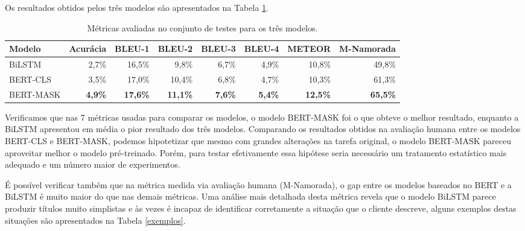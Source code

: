 \documentclass{article}
\begin{document}
Os resultados obtidos pelos três modelos são apresentados na Tabela \ref{table:results}.

\begin{table}[h!]
	\centering
	\begin{tabular}{@{}lrrrrrrr@{}}
		\toprule
		Modelo &
		\multicolumn{1}{l}{Acurácia} &
		\multicolumn{1}{l}{BLEU-1} &
		\multicolumn{1}{l}{BLEU-2} &
		\multicolumn{1}{l}{BLEU-3} &
		\multicolumn{1}{l}{BLEU-4} &
		\multicolumn{1}{l}{METEOR} &
		\multicolumn{1}{l}{M-Namorada} \\ \midrule
		BiLSTM    & 2,7\%          & 16,5\%          & 9,8\%           & 6,7\%          & 4,9\%          & 10,8\%          & 49,8\%          \\
		BERT-CLS  & 3,5\%          & 17,0\%          & 10,4\%          & 6,8\%          & 4,7\%          & 10,3\%          & 61,3\%          \\
		BERT-MASK & \textbf{4,9\%} & \textbf{17,6\%} & \textbf{11,1\%} & \textbf{7,6\%} & \textbf{5,4\%} & \textbf{12,5\%} & \textbf{65,5\%} \\ \bottomrule
	\end{tabular}
	\caption{Métricas avaliadas no conjunto de testes para os três modelos.}
	\label{table:results}
\end{table}

Verificamos que nas 7 métricas usadas para comparar os modelos, o modelo BERT-MASK foi o que obteve o melhor resultado, enquanto a BiLSTM apresentou em média o pior resultado dos três modelos. Comparando os resultados obtidos na avaliação humana entre os modelos BERT-CLS e BERT-MASK, podemos hipotetizar que mesmo com grandes alterações na tarefa original, o modelo BERT-MASK pareceu aproveitar melhor o modelo pré-treinado. Porém, para testar efetivamente essa hipótese seria necessário um tratamento estatístico mais adequado e um número maior de experimentos.

É possível verificar também que na métrica medida via avaliação humana (M-Namorada), o gap entre os modelos baseados no BERT e a BiLSTM é muito maior do que nas demais métricas. Uma análise mais detalhada desta métrica revela que o modelo BiLSTM parece produzir títulos muito simplistas e às vezes é incapaz de identificar corretamente a situação que o cliente descreve, alguns exemplos destas situações são apresentados na Tabela \ref{exemplos}.
\end{document}
